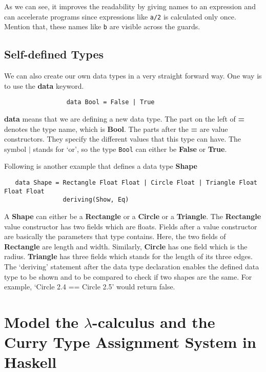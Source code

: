 As we can see, it improves the readability by giving names to an expression and can accelerate programs since expressions like \verb|a/2| is calculated only once. Mention that, these names like \verb|b| are visible across the guards. 

\subsection{Self-defined Types}

We can also create our own data types in a very straight forward way. One way is to use the \textbf{data} keyword.

\begin{verbatim}
                 data Bool = False | True
\end{verbatim} 

\textbf{data} means that we are defining a new data type. The part on the left of \textbf{=} denotes the type name, which is \textbf{Bool}. The parts after the \textbf{=} are value constructors. They specify the different values that this type can have. The symbol $|$ stands for `or', so the type \verb|Bool| can either be \textbf{False} or \textbf{True}. 

Following is another example that defines a data type \textbf{Shape}

\begin{verbatim}
   data Shape = Rectangle Float Float | Circle Float | Triangle Float Float Float
                deriving(Show, Eq)  
\end{verbatim}

A \textbf{Shape} can either be a \textbf{Rectangle} or a \textbf{Circle} or a \textbf{Triangle}. The \textbf{Rectangle} value constructor has two fields which are floats. Fields after a value constructor are basically the parameters that type contains. Here, the two fields of \textbf{Rectangle} are length and width. Similarly, \textbf{Circle} has one field which is the radius. \textbf{Triangle} has three fields which stands for the length of its three edges. The `deriving' statement after the data type declaration enables the defined data type to be shown and to be compared to check if two shapes are the same. For example, `Circle 2.4 == Circle 2.5' would return false. 

\section{Model the $\lambda$-calculus and the Curry Type Assignment System in Haskell}

